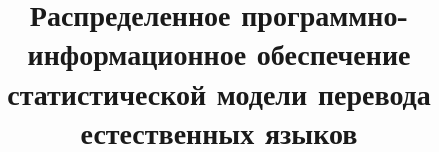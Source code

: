 
	
	
	\title[$\#\insertframenumber \le \inserttotalframenumber$~|~Статистический машинный перевод]{Распределенное программно-информационное обеспечение статистической модели перевода естественных языков}

	


